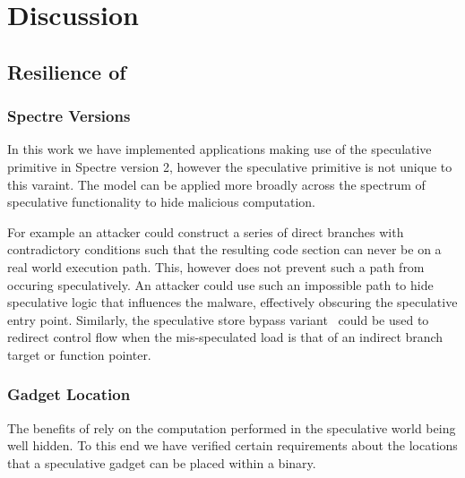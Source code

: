 
\section{Discussion}

\subsection{Resilience of \speculake}
%
\subsubsection{Spectre Versions}
In this work we have implemented applications making use of the speculative
primitive in Spectre version 2, however the speculative primitive is not 
unique to this varaint. The \speculake model can be applied more broadly
across the spectrum of speculative functionality to hide malicious computation.

For example an attacker could construct a series of direct branches with 
contradictory conditions such that the resulting code section can never 
be on a real world execution path. This, however does not prevent such a path
from occuring speculatively. An attacker could use such an impossible path to
hide speculative logic that influences the malware, effectively obscuring the
speculative entry point.
Similarly, the speculative store bypass variant~\cite{spec-store-bypass} could be used to
redirect control flow when the mis-speculated load is that of an indirect
branch target or function pointer.






\subsubsection{Gadget Location}
The benefits of \speculake rely on the computation performed in the
speculative world being well hidden. To this end we have verified 
certain requirements about the locations that a speculative gadget can 
be placed within a binary. 

